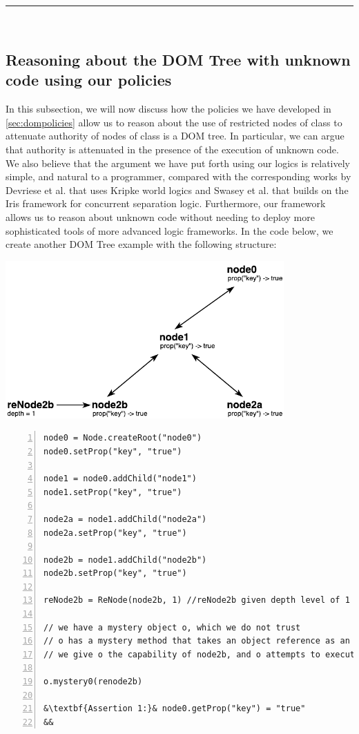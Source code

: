 \documentclass[a4paper,11pt,twoside]{article}
\newcommand{\hr}{\rule{\linewidth}{0.4pt}}
\begin{document}
\hr\\

\subsection{Reasoning about the DOM Tree with unknown code using our policies}\label{sec:treereasoning}
In this subsection, we will now discuss how the policies we have developed in \cref{sec:dompolicies} allow us to reason about  the use of restricted nodes of class  to attenuate authority of nodes of class  is a DOM tree. In particular, we can argue that authority is attenuated in the presence of the execution of unknown code. We also believe that the argument we have put forth using our logics is relatively simple, and natural to a programmer, compared with the corresponding works by Devriese et al.\cite{devriese2016} that uses Kripke world logics and Swasey et al.\cite{swasey2017} that builds on the Iris framework for concurrent separation logic. Furthermore, our framework allows us to reason about unknown code without needing to deploy more sophisticated tools of more advanced logic frameworks. In the code below, we create another DOM Tree example with the following structure:\\
\begin{minipage}{\textwidth}
\centering
\includegraphics[width=0.80\textwidth]{figures/assertion.pdf}
  \label{DOM example}
\end{minipage}
\begin{lstlisting}[numbers = left]
node0 = Node.createRoot("node0")
node0.setProp("key", "true")

node1 = node0.addChild("node1")
node1.setProp("key", "true")

node2a = node1.addChild("node2a")
node2a.setProp("key", "true")

node2b = node1.addChild("node2b")
node2b.setProp("key", "true")

reNode2b = ReNode(node2b, 1) //reNode2b given depth level of 1

// we have a mystery object o, which we do not trust
// o has a mystery method that takes an object reference as an argument
// we give o the capability of node2b, and o attempts to execute a mystery method on renode2b:

o.mystery0(renode2b)

&\textbf{Assertion 1:}& node0.getProp("key") = "true"
&&
\end{lstlisting} 
\end{document}
